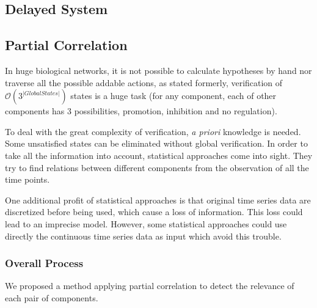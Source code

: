 \subsection{Delayed System}

\begin{definition}
    
\end{definition}

\subsection{Partial Correlation}
 In huge biological networks, it is not possible to calculate hypotheses by hand nor traverse all the possible addable actions, as stated formerly, verification of $\mathcal{O}(3^{|Global States|})$ states is a huge task (for any component, each of other components has 3 possibilities, promotion, inhibition and no regulation).
 
To deal with the great complexity of verification, \textit{a priori} knowledge is needed. 
Some unsatisfied states can be eliminated without global verification.  
In order to take all the information into account, statistical approaches come into sight.
They try to find relations between different components from the observation of all the time points.

One additional profit of statistical approaches is that original time series data are discretized before being used, which cause a loss of information.
This loss could lead to an imprecise model.
However, some statistical approaches could use directly the continuous time series data as input which avoid this trouble.

\subsubsection{Overall Process}
We proposed a method applying partial correlation to detect the relevance of each pair of components.

